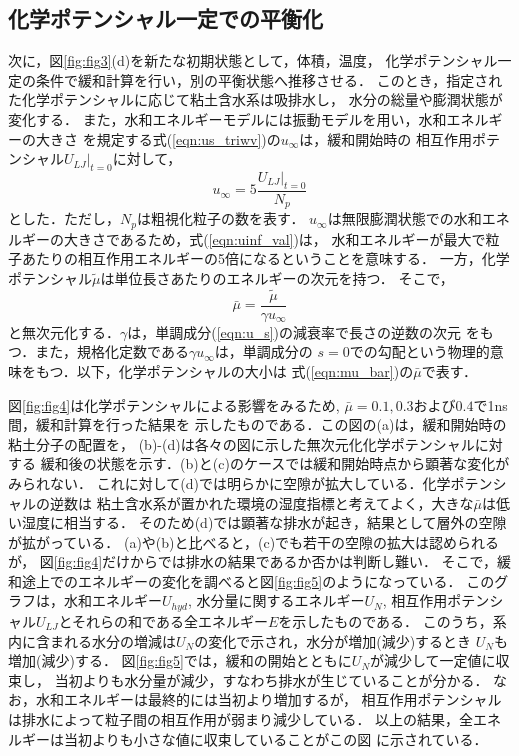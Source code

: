 \subsection{化学ポテンシャル一定での平衡化}
次に，図\ref{fig:fig3}(d)を新たな初期状態として，体積，温度，
化学ポテンシャル一定の条件で緩和計算を行い，別の平衡状態へ推移させる．
このとき，指定された化学ポテンシャルに応じて粘土含水系は吸排水し，
水分の総量や膨潤状態が変化する．
また，水和エネルギーモデルには振動モデルを用い，水和エネルギーの大きさ
を規定する式(\ref{eqn:us_triwv})の$u_{\infty}$は，緩和開始時の
相互作用ポテンシャル$\left. U_{LJ}\right|_{t=0}$に対して，
\begin{equation}
	u_{\infty}=5\frac{\left.U_{LJ}\right|_{t=0}}{N_p}
	\label{eqn:uinf_val}
\end{equation}
とした．ただし，$N_p$は粗視化粒子の数を表す．
$u_{\infty}$は無限膨潤状態での水和エネルギーの大きさであるため，式(\ref{eqn:uinf_val})は，
水和エネルギーが最大で粒子あたりの相互作用エネルギーの5倍になるということを意味する．
一方，化学ポテンシャル$\tilde \mu$は単位長さあたりのエネルギーの次元を持つ．
そこで，
\begin{equation}
	\bar \mu = \frac{\tilde \mu }{\gamma u_{\infty}}
	\label{eqn:mu_bar}
\end{equation}
と無次元化する．$\gamma$は，単調成分(\ref{eqn:u_s})の減衰率で長さの逆数の次元
をもつ．また，規格化定数である$\gamma u_\infty$は，単調成分の
$s=0$での勾配という物理的意味をもつ．以下，化学ポテンシャルの大小は
式(\ref{eqn:mu_bar})の$\bar \mu$で表す．

図\ref{fig:fig4}は化学ポテンシャルによる影響をみるため,
$\bar{\mu}=0.1, 0.3$および$0.4$で1ns間，緩和計算を行った結果を
示したものである．この図の(a)は，緩和開始時の粘土分子の配置を，
(b)-(d)は各々の図に示した無次元化化学ポテンシャルに対する
緩和後の状態を示す．(b)と(c)のケースでは緩和開始時点から顕著な変化がみられない．
これに対して(d)では明らかに空隙が拡大している．化学ポテンシャルの逆数は
粘土含水系が置かれた環境の湿度指標と考えてよく，大きな$\bar{\mu}$は低い湿度に相当する．
そのため(d)では顕著な排水が起き，結果として層外の空隙が拡がっている．
(a)や(b)と比べると，(c)でも若干の空隙の拡大は認められるが，
図\ref{fig:fig4}だけからでは排水の結果であるか否かは判断し難い．
そこで，緩和途上でのエネルギーの変化を調べると図\ref{fig:fig5}のようになっている．
このグラフは，水和エネルギー$U_{hyd}$, 水分量に関するエネルギー$U_{N}$,
相互作用ポテンシャル$U_{LJ}$とそれらの和である全エネルギー$E$を示したものである．
このうち，系内に含まれる水分の増減は$U_{N}$の変化で示され，水分が増加(減少)するとき
$U_N$も増加(減少)する．
図\ref{fig:fig5}では，緩和の開始とともに$U_{N}$が減少して一定値に収束し，
当初よりも水分量が減少，すなわち排水が生じていることが分かる．
なお，水和エネルギーは最終的には当初より増加するが，
相互作用ポテンシャルは排水によって粒子間の相互作用が弱まり減少している．
以上の結果，全エネルギーは当初よりも小さな値に収束していることがこの図
に示されている．

